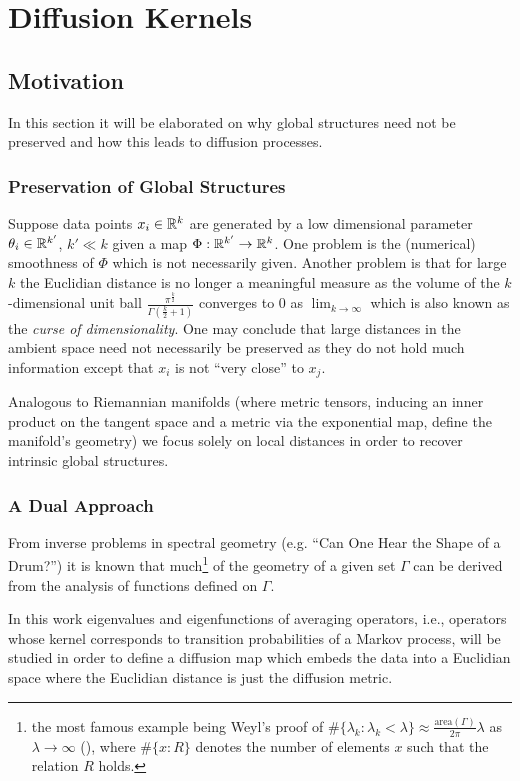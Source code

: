 \section{Diffusion Kernels}
\subsection{Motivation}
In this section it will be elaborated on why global structures need not be preserved and how this leads to diffusion processes.
\subsubsection{Preservation of Global Structures}
Suppose data points $x_i \in \mathbb{R}^k$ are generated by a low dimensional parameter $\theta_i \in \mathbb{R}^{k'}$, $k' \ll k$ given a map $\Phi: \mathbb{R}^{k'} \rightarrow \mathbb{R}^k$. One problem is the (numerical) smoothness of $\Phi$ which is not necessarily given.
Another problem is that for large $k$ the Euclidian distance is no longer a meaningful measure as the volume of the $k$-dimensional unit ball $\frac{\pi^\frac{k}{2}}{\Gamma(\frac{k}{2}+1)}$ converges to $0$ as $\lim_{k\rightarrow\infty}$ which is also known as the \textit{curse of dimensionality}. One may conclude that large distances in the ambient space need not necessarily be preserved as they do not hold much information except that $x_i$ is not ``very close'' to $x_j$.

Analogous to Riemannian manifolds (where metric tensors, inducing an inner product on the tangent space and a metric via the exponential map, define the manifold's geometry) we focus solely on local distances in order to recover intrinsic global structures.

\subsubsection{A Dual Approach}
From inverse problems in spectral geometry (e.g. ``Can One Hear the Shape of a Drum?'') it is known that much\footnote{the most famous example being Weyl's proof of $\#\{\lambda_k : \lambda_k < \lambda\} \approx \frac{\text{area}(\Gamma)}{2\pi}\lambda$ as $\lambda \rightarrow \infty$ (\cite{Canzani2013}), where $\#\{x:R\}$ denotes the number of elements $x$ such that the relation $R$ holds.} of the geometry of a given set $\Gamma$ can be derived from the analysis of functions defined on $\Gamma$.

In this work eigenvalues and eigenfunctions of averaging operators, i.e., operators whose kernel corresponds to transition probabilities of a Markov process, will be studied in order to define a diffusion map which embeds the data into a Euclidian space where the Euclidian distance is just the diffusion metric.

